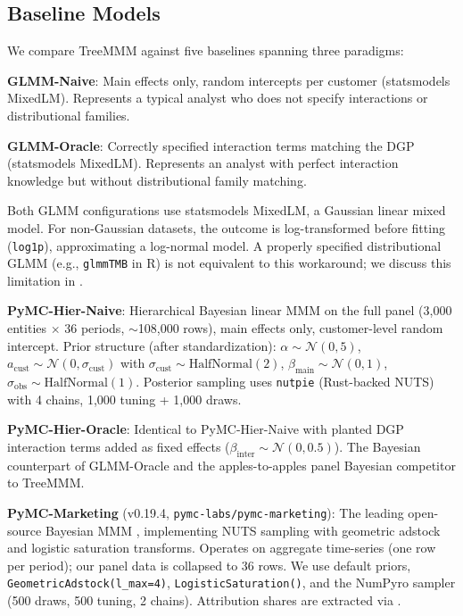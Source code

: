 \documentclass[review,12pt]{elsarticle}
\begin{document}
\subsection{Baseline Models}
\label{sec:methods:baselines}

We compare TreeMMM against five baselines spanning three paradigms:

\textbf{GLMM-Naive}: Main effects only, random intercepts per customer
(statsmodels MixedLM). Represents a typical analyst who does not specify
interactions or distributional families.

\textbf{GLMM-Oracle}: Correctly specified interaction terms matching the DGP
(statsmodels MixedLM). Represents an analyst with perfect interaction knowledge
but without distributional family matching.

Both GLMM configurations use statsmodels MixedLM, a Gaussian linear mixed
model. For non-Gaussian datasets, the outcome is log-transformed before fitting
(\texttt{log1p}), approximating a log-normal model. A properly specified
distributional GLMM (e.g., \texttt{glmmTMB} in R) is not equivalent to this
workaround; we discuss this limitation in .

\textbf{PyMC-Hier-Naive}: Hierarchical Bayesian linear MMM on the full panel
(3,000 entities $\times$ 36 periods, $\sim$108,000 rows), main effects only,
customer-level random intercept. Prior structure (after standardization):
$\alpha \sim \mathcal{N}(0, 5)$, $a_\text{cust} \sim \mathcal{N}(0, \sigma_\text{cust})$
with $\sigma_\text{cust} \sim \text{HalfNormal}(2)$, $\beta_\text{main} \sim \mathcal{N}(0, 1)$,
$\sigma_\text{obs} \sim \text{HalfNormal}(1)$. Posterior sampling uses
\texttt{nutpie} (Rust-backed NUTS) with 4 chains, 1,000 tuning + 1,000 draws.

\textbf{PyMC-Hier-Oracle}: Identical to PyMC-Hier-Naive with planted DGP
interaction terms added as fixed effects
($\beta_\text{inter} \sim \mathcal{N}(0, 0.5)$). The Bayesian counterpart of
GLMM-Oracle and the apples-to-apples panel Bayesian competitor to TreeMMM.

\textbf{PyMC-Marketing} (v0.19.4, \texttt{pymc-labs/pymc-marketing}): The leading
open-source Bayesian MMM \cite{pymcmarketing2023}, implementing NUTS sampling with geometric adstock and
logistic saturation transforms. Operates on aggregate time-series (one row per
period); our panel data is collapsed to 36 rows. We use default priors,
\texttt{GeometricAdstock(l\_max=4)}, \texttt{LogisticSaturation()}, and the
NumPyro sampler (500 draws, 500 tuning, 2 chains). Attribution shares are
extracted via .
\end{document}
